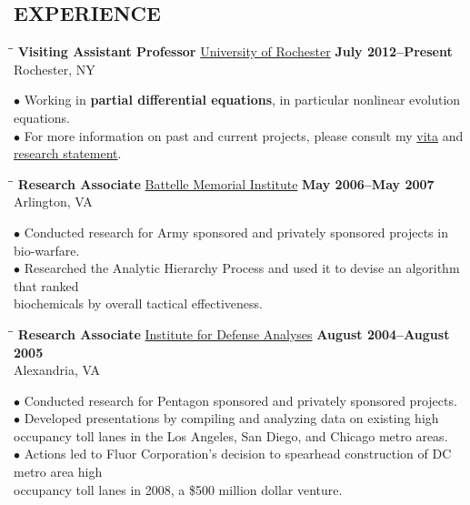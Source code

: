 \documentclass{resume}
\begin{document}
\begin{resume}
		 \section{EXPERIENCE}
	\vspace{-0.1in}	
    \begin{tabbing}
		\hspace{2.3in}\= \hspace{2.6in}\= \kill
        {\bf Visiting Assistant Professor} \>\href{http://math.rochester.edu/}{University of Rochester}     
	\>\textbf{July 2012--Present} \\
		\>Rochester, NY 
	\end{tabbing}\vspace{-15pt}    
	$\bullet$ Working in \textbf{partial differential equations}, in particular nonlinear evolution equations.  
	\\
$\bullet$ For more information on past and current projects, please consult
my \href{http://davidkarapetyan.com/pdfs/cv.pdf}{vita} and
\href{http://davidkarapetyan.com/pdfs/research-statement.pdf}{research
statement}. 	
	\begin{tabbing}
		\hspace{2.3in}\= \hspace{2.6in}\= \kill
        {\bf Research Associate} \>\href{http://www.battelle.org/}{Battelle
        Memorial Institute}     
	\>\textbf{May 2006--May 2007} \\
		\>Arlington, VA
	\end{tabbing}\vspace{-15pt}    
	$\bullet$ Conducted research for Army sponsored and privately sponsored projects 
	in bio-warfare. \\ 
      $\bullet$ Researched the Analytic Hierarchy Process 
	and used it to devise an algorithm that ranked \\
	\phantom{$\bullet$} biochemicals by 
	overall tactical effectiveness.
	\begin{tabbing}
		\hspace{2.3in}\= \hspace{2.6in}\= \kill
        {\bf Research Associate } \>\href{https://www.ida.org/}{Institute for
        Defense Analyses} \>  
	\textbf{August 2004--August 2005}\\
		\>Alexandria, VA
	\end{tabbing}\vspace{-15pt}
	$\bullet$ Conducted research for Pentagon sponsored and privately
	sponsored projects. 
	\\ 
	$\bullet$ Developed presentations by compiling and
	analyzing data on existing high occupancy toll lanes in 
	\phantom{$\bullet$} the Los
	Angeles, San Diego, and
	Chicago metro areas.  
	\\
	$\bullet$ Actions led to Fluor Corporation's decision to
	spearhead construction of DC metro area high \\
	\phantom{$\bullet$} occupancy toll lanes
	in 2008, a \$500
	million dollar venture.


\end{resume}
\end{document}
